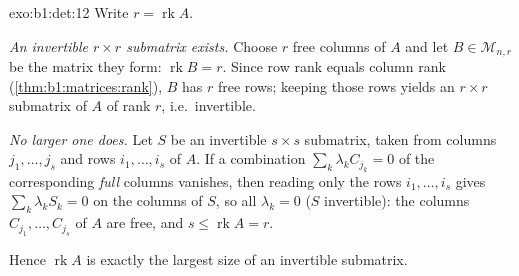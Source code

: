 \begin{solution}{exo:b1:det:12}
Write $r = \operatorname{rk} A$.

\emph{An invertible $r \times r$ submatrix exists.} Choose $r$
free columns of $A$ and let $B \in \mathcal{M}_{n,r}$ be the
matrix they form: $\operatorname{rk} B = r$. Since row rank
equals column rank (\cref{thm:b1:matrices:rank}), $B$ has $r$
free rows; keeping those rows yields an $r \times r$ submatrix
of $A$ of rank $r$, i.e.\ invertible.

\emph{No larger one does.} Let $S$ be an invertible $s \times s$
submatrix, taken from columns $j_1, \dots, j_s$ and rows $i_1,
\dots, i_s$ of $A$. If a combination $\sum_k \lambda_k
C_{j_k} = 0$ of the corresponding \emph{full} columns vanishes,
then reading only the rows $i_1, \dots, i_s$ gives $\sum_k
\lambda_k S_k = 0$ on the columns of $S$, so all $\lambda_k = 0$
($S$ invertible): the columns $C_{j_1}, \dots, C_{j_s}$ of $A$
are free, and $s \leq \operatorname{rk} A = r$.

Hence $\operatorname{rk} A$ is exactly the largest size of an
invertible submatrix.
\end{solution}

